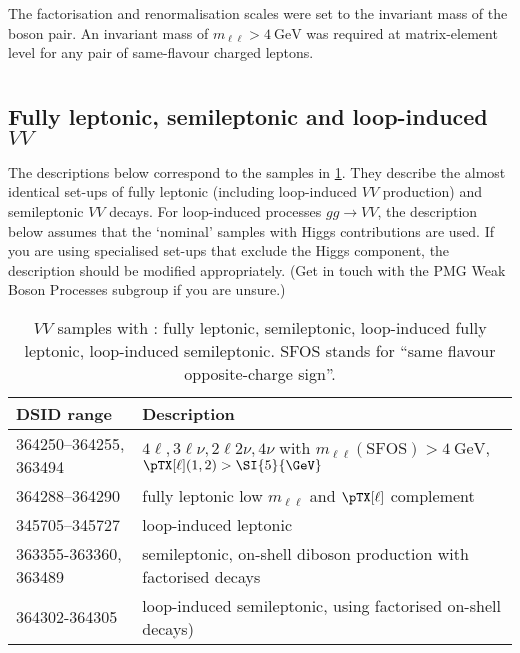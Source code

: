 The factorisation and renormalisation scales were set to the invariant mass of
the boson pair. An invariant mass of $m_{\ell\ell} > \SI{4}{\GeV}$ was required
at matrix-element level for any pair of same-flavour charged leptons.


\section[Sherpa]{\SHERPA}

\subsection{Fully leptonic, semileptonic and loop-induced \texorpdfstring{$VV$}{VV}}

The descriptions below correspond to the samples in
\cref{tab:MB-sherpa}. They describe the almost
identical set-ups of fully leptonic (including loop-induced $VV$ production)
and semileptonic $VV$ decays. For loop-induced processes $gg\to VV$, 
the description below assumes that the `nominal' samples with 
Higgs contributions are used. If you are using specialised set-ups that
exclude the Higgs component, the description should be modified appropriately.
(Get in touch with the PMG Weak Boson Processes subgroup if you are unsure.)

\begin{table}[htbp]
  \caption{$VV$ samples with \SHERPA: fully leptonic, semileptonic,
    loop-induced fully leptonic, loop-induced semileptonic. SFOS stands for
    \enquote{same flavour opposite-charge sign}.}%
  \label{tab:MB-sherpa}
  \centering
  \begin{tabular}{l l}
    \toprule
    DSID range & Description \\
    \midrule
    364250--364255, 363494   & $4\ell, 3\ell\nu, 2\ell 2\nu, 4\nu$ with $m_{\ell\ell}\mathrm{(SFOS)} > \SI{4}{\GeV}$, $\pTX[\ell](1,2) > \SI{5}{\GeV}$\\
    364288--364290 & fully leptonic low $m_{\ell\ell}$ and $\pTX[\ell]$ complement\\
    \midrule
    345705--345727   & loop-induced leptonic\\
    \midrule
    363355-363360, 363489   & semileptonic, on-shell diboson production with factorised decays\\
    \midrule
    364302-364305   & loop-induced semileptonic, using factorised on-shell decays)\\
    \bottomrule
  \end{tabular}
\end{table}

